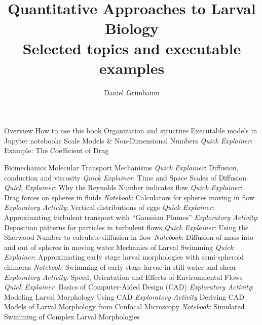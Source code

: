 \documentclass[10pt,a4paper]{article}
\begin{document}
\def\QE{\textit{Quick Explainer}\xspace}
\def\NB{\textit{Notebook}\xspace}
\def\EA{\textit{Exploratory Activity}\xspace}
\def\MD{\textit{Modeling Description}\xspace}
	
\title{Quantitative Approaches to Larval Biology \\ {\Large Selected topics and executable examples}}
	
\author{Daniel Gr\"unbaum}
\maketitle
	
\begin{outline}[enumerate]
\1 Overview 
	\2 How to use this book
		\3 Organization and structure
		\3 Executable models in Jupyter notebooks
	\2 Scale Models \& Non-Dimensional Numbers
		\3 \QE: Example: The Coefficient of Drag
		
\1 Biomechanics
	\2 Molecular Transport Mechanisms
		\3 \QE: Diffusion, conduction and viscosity
		\3 \QE: Time and Space Scales of Diffusion
		\3 \QE: Why the Reynolds Number indicates flow
		\3 \QE: Drag forces on spheres in fluids
		\3 \NB: Calculators for spheres moving in flow
		\3 \EA: Vertical distributions of eggs 
		\3 \QE: Approximating turbulent transport with ``Gaussian Plumes''
		\3 \EA: Deposition patterns for particles in turbulent flows
		\3 \QE: Using the Sherwood Number to calculate diffusion in flow
		\3 \NB: Diffusion of mass into and out of spheres in moving water
	\2 Mechanics of Larval Swimming
		\3 \QE: Approximating early stage larval morphologies with semi-spheroid chimeras
		\3 \NB: Swimming of early stage larvae in still water and shear 
		\3 \EA: Speed, Orientation and Effects of Environmental Flows
		\3 \QE: Basics of Computer-Aided Design (CAD)
		\3 \EA: Modeling Larval Morphology Using CAD
		\3 \EA  Deriving CAD Models of Larval Morphology from Confocal Microscopy
		\3 \NB: Simulated Swimming of Complex Larval Morphologies
		

\end{outline}
\end{document}
